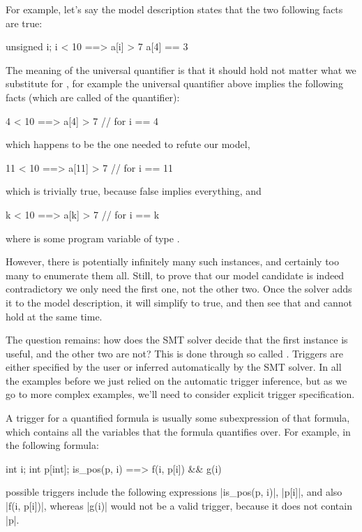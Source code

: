For example, let's say the model description states that the two
following facts are true:
\begin{VCC}
\forall unsigned i; i < 10 ==> a[i] > 7
a[4] == 3
\end{VCC}
The meaning of the universal quantifier is that it should hold
not matter what we substitute for , for example
the universal quantifier above implies the following facts (which
are called  of the quantifier):
\begin{VCC}
 4 < 10 ==>  a[4] > 7  // for i == 4
\end{VCC}
which happens to be the one needed to refute our model,
\begin{VCC}
11 < 10 ==> a[11] > 7  // for i == 11
\end{VCC}
which is trivially true, because false implies everything, and
\begin{VCC}
 k < 10 ==>  a[k] > 7  // for i == k
\end{VCC}
where  is some program variable of type .

However, there is potentially infinitely many such instances, and certainly too many
to enumerate them all.
Still, to prove that our model candidate is indeed contradictory
we only need the first one, not the other two.
Once the solver adds it to the model description,
it will simplify  to true,
and then see that  and  cannot hold
at the same time.

The question remains: how does the SMT solver decide that the first
instance is useful, and the other two are not?
This is done through so called .
Triggers are either specified by the user or inferred automatically
by the SMT solver.
In all the examples before we just relied on the automatic trigger
inference, but as we go to more complex examples, we'll need to consider
explicit trigger specification.

A trigger for a quantified formula is usually some subexpression 
of that formula, which contains all the variables that the formula
quantifies over.
For example, in the following formula:
\begin{VCC}
\forall int i; int p[int]; is_pos(p, i) ==> f(i, p[i]) && g(i)
\end{VCC}
possible triggers include the following expressions
\vcc|is_pos(p, i)|, \vcc|p[i]|, and also \vcc|f(i, p[i])|,
whereas \vcc|g(i)| would not be a valid trigger, because
it does not contain \vcc|p|.

